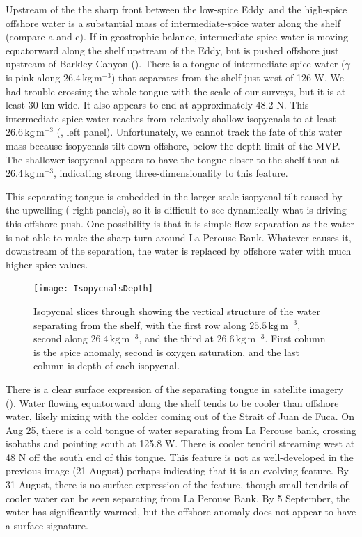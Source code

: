 \documentclass[draft]{agujournal2019}
\newcommand*{\Eddy}{{\sc Eddy}}
\begin{document}
Upstream of the the sharp front between the low-spice \Eddy\ and the high-spice offshore water is a substantial mass of intermediate-spice water along the shelf (compare a and c).   If in geostrophic balance, intermediate spice water is moving equatorward along the shelf upstream of the \Eddy, but is pushed offshore just upstream of Barkley Canyon ().  There is a tongue of intermediate-spice water ($\gamma$ is pink along $26.4\,\mathrm{kg\,m^{-3}}$) that separates from the shelf just west of 126 W. We had trouble crossing the whole tongue with the scale of our surveys, but it is at least 30 km wide. It also appears to end at approximately 48.2 N.  This intermediate-spice water reaches from relatively shallow isopycnals to at least $26.6\,\mathrm{kg\,m^{-3}}$ (, left panel).  Unfortunately, we cannot track the fate of this water mass because isopycnals tilt down offshore, below the depth limit of the MVP.   The shallower isopycnal appears to have the tongue closer to the shelf than at $26.4\,\mathrm{kg\,m^{-3}}$, indicating strong three-dimensionality to this feature.

This separating tongue is embedded in the larger scale isopycnal tilt caused by the upwelling ( right panels), so it is difficult to see dynamically what is driving this offshore push.  One possibility is that it is simple flow separation as the water is not able to make the sharp turn around La Perouse Bank.  Whatever causes it, downstream of the separation, the water is replaced by offshore water with much higher spice values.

\begin{figure}[htbp]
  \begin{center}
    \texttt{[image: IsopycnalsDepth]}
    \caption{Isopycnal slices through showing the vertical structure of the water separating from the shelf, with the first row along $25.5 \,\mathrm{kg\,m^{-3}}$, second along $26.4\,\mathrm{kg\,m^{-3}}$, and the third at $26.6\,\mathrm{kg\,m^{-3}}$.  First column is the spice anomaly, second is oxygen saturation, and the last column is depth of each isopycnal.
      \label{fig:IsopycnalsDepth} }
  \end{center}
\end{figure}

There is a clear surface expression of the separating tongue in satellite imagery ().  Water flowing equatorward along the shelf tends to be cooler than offshore water, likely mixing with the colder coming out of the Strait of Juan de Fuca. On Aug 25, there is a cold tongue of water separating from La Perouse bank, crossing isobaths and pointing south at 125.8 W.   There is cooler tendril streaming west at 48 N off the south end of this tongue.  This feature is not as well-developed in the previous image (21 August) perhaps indicating that it is an evolving feature.  By 31 August, there is no surface expression of the feature, though small tendrils of cooler water can be seen separating from La Perouse Bank.  By 5 September, the water has significantly warmed, but the offshore anomaly does not appear to have a surface signature.
\end{document}
